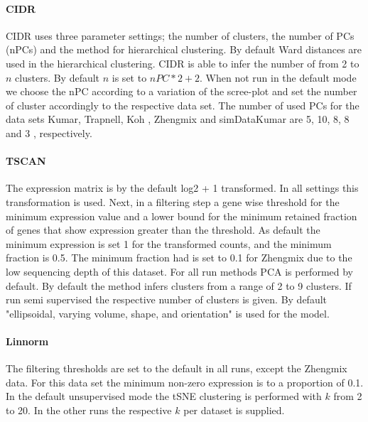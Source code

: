 \documentclass[11pt, a4paper]{article}\usepackage[]{graphicx}\usepackage[]{color}
\begin{document}
\paragraph{CIDR}
CIDR uses three parameter settings; the number of clusters, the number of PCs (nPCs) and the method for hierarchical clustering. By default Ward distances are used in the hierarchical clustering. CIDR is able to infer the number of from 2 to $n$ clusters. By default $n$ is set to $nPC*2+2$. When not run in the default mode we choose the nPC according to a variation of the scree-plot and set the number of cluster accordingly to the respective data set. The number of used PCs for the data sets Kumar, Trapnell, Koh , Zhengmix and simDataKumar are  5, 10, 8, 8 and 3 , respectively.
\paragraph{TSCAN}
The expression matrix is by the default log2 + 1 transformed. In all settings this transformation is used. 
Next, in a filtering step a gene wise threshold for the minimum expression value and a lower bound for the minimum retained fraction of genes that show expression greater than the threshold. As default the minimum expression is set 1 for the transformed counts,  and the minimum fraction is 0.5. The minimum fraction had is set to 0.1 for Zhengmix due to the low sequencing depth of this dataset. For all run methods PCA is performed by default. By default the method infers clusters from a range of 2 to 9 clusters. If run semi supervised the respective number of clusters is given. By default "ellipsoidal, varying volume, shape, and orientation" is used for the model.
\paragraph{Linnorm}
The filtering thresholds are set to the default in all runs, except the Zhengmix data.  For this data set the minimum non-zero expression is to a proportion of 0.1. In the default unsupervised mode the tSNE clustering is performed with $k$ from 2 to 20. In the other runs the respective $k$ per dataset is supplied.
\end{document}
